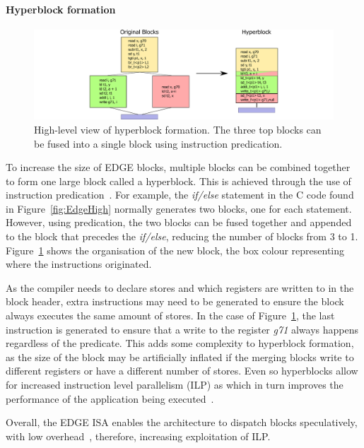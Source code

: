 \paragraph*{Hyperblock formation}
\begin{figure}[t]
    \centering
    \includegraphics[width=1\textwidth]{background/graphics/hyperblock.pdf}
    \caption{High-level view of hyperblock formation. The three top blocks can be fused into a single block using instruction predication.}
    \label{fig:EdgeHB}
	\vspace{-1em}
\end{figure}
To increase the size of EDGE blocks, multiple blocks can be combined together to form one large block called a hyperblock.
This is achieved through the use of instruction predication~\cite{smith2006edge}.
For example, the \textit{if/else} statement in the C code found in Figure~\ref{fig:EdgeHigh} normally generates two blocks, one for each statement.
However, using predication, the two blocks can be fused together and appended to the block that precedes the \textit{if/else}, reducing the number of blocks from 3 to 1.
Figure~\ref{fig:EdgeHB} shows the organisation of the new block, the box colour representing where the instructions originated.

As the compiler needs to declare stores and which registers are written to in the block header, extra instructions may need to be generated to ensure the block always executes the same amount of stores.
In the case of Figure~\ref{fig:EdgeHB}, the last instruction is generated to ensure that a write to the register \textit{g71} always happens regardless of the predicate.
This adds some complexity to hyperblock formation, as the size of the block may be artificially inflated if the merging blocks write to different registers or have a different number of stores.
Even so hyperblocks allow for increased instruction level parallelism (ILP) as  which in turn improves the performance of the application being executed~\cite{smith2006edge}.

Overall, the EDGE ISA enables the architecture to dispatch blocks speculatively, with low overhead~\cite{putnam2010e2,kim2007tflex}, therefore, increasing exploitation of ILP.

